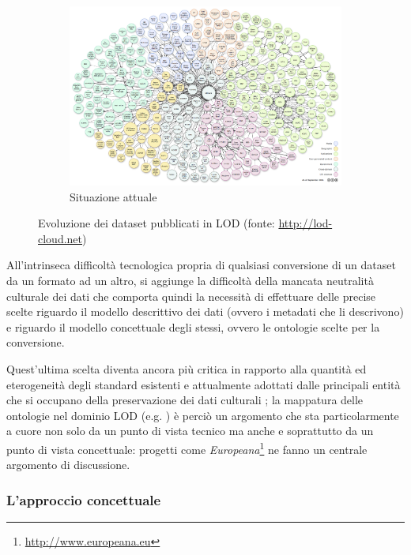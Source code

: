 \begin{figure}
    \begin{subfigure}[b]{\textwidth}
            \includegraphics[width=\textwidth]{images/lod-cloud-2011.png}
            \caption{Situazione attuale}
            \label{fig:lod-cloud-2011}
    \end{subfigure}
    \caption{Evoluzione dei dataset pubblicati in LOD (fonte: \protect\url{http://lod-cloud.net})}
    \label{fig:lod-cloud}
\end{figure}

All'intrinseca difficoltà tecnologica propria di qualsiasi conversione di un dataset da un formato ad un altro, si aggiunge la difficoltà della mancata neutralità culturale dei dati che comporta quindi la necessità di effettuare delle precise scelte riguardo il modello descrittivo dei dati (ovvero i metadati che li descrivono) e riguardo il modello concettuale degli stessi, ovvero le ontologie scelte per la conversione.

Quest'ultima scelta diventa ancora più critica in rapporto alla quantità ed eterogeneità degli standard esistenti e attualmente adottati dalle principali entità che si occupano della preservazione dei dati culturali \cite{6}; la mappatura delle ontologie nel dominio LOD (e.g. \cite{7}) è perciò un argomento che sta particolarmente a cuore non solo da un punto di vista tecnico ma anche e soprattutto da un punto di vista concettuale: progetti come \emph{Europeana}\footnote{\url{http://www.europeana.eu}} ne fanno un centrale argomento di discussione.

\newpage
\subsubsection{L'approccio concettuale}

